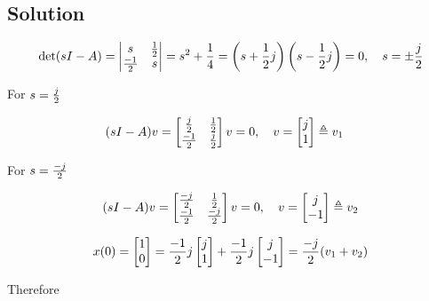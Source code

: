 \documentclass[12pt,a4paper]{article}
\begin{document}
\subsection*{Solution}

\begin{align*}
	\det (sI - A) = \begin{vmatrix}
		s & {1\over2} \\
		{-1\over 2} & s
	\end{vmatrix} = s^2 + {1\over4} = \left(s + {1\over2}j\right) \left(s - {1\over 2}j\right) = 0, \quad s = \pm{j\over2 }
\end{align*}

For $s = {j\over2}$

\begin{align*}
	(sI - A) v &= \begin{bmatrix}
		{j\over2} & {1\over2} \\
		{-1\over2} & {j\over2}
	\end{bmatrix} v = 0, \quad v = \begin{bmatrix}
	j \\ 1
	\end{bmatrix} \triangleq v_1
\end{align*}

For $s = {-j\over2}$

\[
(sI - A)v = \begin{bmatrix}
	{-j\over2} & {1\over2} \\
	{-1\over2} & {-j\over2}
\end{bmatrix}v = 0, \quad v = \begin{bmatrix}
j \\ -1
\end{bmatrix}\triangleq v_2
\]

\[
x(0) = \begin{bmatrix}
	1 \\ 0
\end{bmatrix} = {-1\over2}j \begin{bmatrix}
j \\ 1
\end{bmatrix} + {-1\over2}j \begin{bmatrix}
j \\ -1
\end{bmatrix} = {-j\over2} (v_1 + v_2)
\]

Therefore
\end{document}
